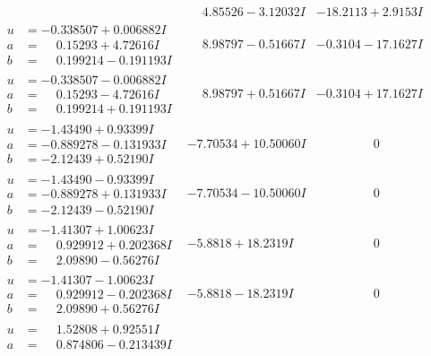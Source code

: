 \documentclass[1p]{elsarticle_modified}
\theoremstyle{definition}
\begin{document}
$$\begin{array}{c|c|c}
 & \phantom{-}4.85526 - 3.12032 I & -18.2113 + 2.9153 I \\ \hline\begin{aligned}
u &= -0.338507 + 0.006882 I \\
a &= \phantom{-}0.15293 + 4.72616 I \\
b &= \phantom{-}0.199214 - 0.191193 I\end{aligned}
 & \phantom{-}8.98797 - 0.51667 I & -0.3104 - 17.1627 I \\ \hline\begin{aligned}
u &= -0.338507 - 0.006882 I \\
a &= \phantom{-}0.15293 - 4.72616 I \\
b &= \phantom{-}0.199214 + 0.191193 I\end{aligned}
 & \phantom{-}8.98797 + 0.51667 I & -0.3104 + 17.1627 I \\ \hline\begin{aligned}
u &= -1.43490 + 0.93399 I \\
a &= -0.889278 - 0.131933 I \\
b &= -2.12439 + 0.52190 I\end{aligned}
 & -7.70534 + 10.50060 I & \phantom{-0.000000 } 0 \\ \hline\begin{aligned}
u &= -1.43490 - 0.93399 I \\
a &= -0.889278 + 0.131933 I \\
b &= -2.12439 - 0.52190 I\end{aligned}
 & -7.70534 - 10.50060 I & \phantom{-0.000000 } 0 \\ \hline\begin{aligned}
u &= -1.41307 + 1.00623 I \\
a &= \phantom{-}0.929912 + 0.202368 I \\
b &= \phantom{-}2.09890 - 0.56276 I\end{aligned}
 & -5.8818 + 18.2319 I & \phantom{-0.000000 } 0 \\ \hline\begin{aligned}
u &= -1.41307 - 1.00623 I \\
a &= \phantom{-}0.929912 - 0.202368 I \\
b &= \phantom{-}2.09890 + 0.56276 I\end{aligned}
 & -5.8818 - 18.2319 I & \phantom{-0.000000 } 0 \\ \hline\begin{aligned}
u &= \phantom{-}1.52808 + 0.92551 I \\
a &= \phantom{-}0.874806 - 0.213439 I \\

\end{aligned}
\end{array}$$
\end{document}
